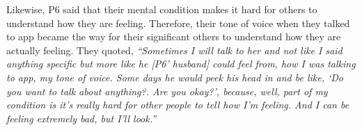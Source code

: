         Likewise, P6 said that their mental condition makes it hard for others to understand how they are feeling. Therefore, their tone of voice when they talked to \acl{app} became the way for their significant others to understand how they are actually feeling. They quoted,
            \textit{
            ``Sometimes I will talk to her and not like I said anything specific but more like he [P6' husband] could feel from, how I was talking to \acl{app}, my tone of voice. Some days he would peek his head in and be like, `Do you want to talk about anything?. Are you okay?', because, well, part of my condition is it's really hard for other people to tell how I'm feeling. And I can be feeling extremely bad, but I'll look.''
            }
        
